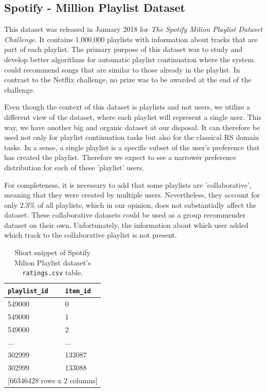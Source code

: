 \subsection{Spotify - Million Playlist Dataset}
This dataset was released in January 2018 for \textit{The Spotify Milion Playlist Dataset Challenge}. It contains 1,000,000 playlists with information about tracks that are part of each playlist. The primary purpose of this dataset was to study and develop better algorithms for automatic playlist continuation where the system could recommend songs that are similar to those already in the playlist. In contrast to the Netflix challenge, no prize was to be awarded at the end of the challenge.

Even though the context of this dataset is playlists and not users, we utilize a different view of the dataset, where each playlist will represent a single user. This way, we have another big and organic dataset at our disposal. It can therefore be used not only for playlist continuation tasks but also for the classical RS domain tasks. In a sense, a single playlist is a specific subset of the user's preference that has created the playlist. Therefore we expect to see a narrower preference distribution for each of these 'playlist' users.

For completeness, it is necessary to add that some playlists are 'collaborative', meaning that they were created by multiple users. Nevertheless, they account for only 2.3\% of all playlists, which in our opinion, does not substantially affect the dataset. These collaborative datasets could be used as a group recommender dataset on their own. Unfortunately, the information about which user added which track to the collaborative playlist is not present.

\begin{table}[!ht]
    \centering
    \begin{tabular}{ l l }
        \verb|playlist_id|   & \verb|item_id| \\
        \hline
        549000     &  0  \\
        549000     & 1  \\
        549000     & 2  \\
        ...      & ...  \\
        302999 & 133087 \\
        302999 & 133088 \\ [1mm]
        \multicolumn{2}{l}{{[66346428 rows x 2 columns]}}
    \end{tabular}
    \caption{Short snippet of Spotify Milion Playlist dataset's \texttt{ratings.csv} table.}
    \label{table:5.1_Spotify_ratings}
\end{table}


